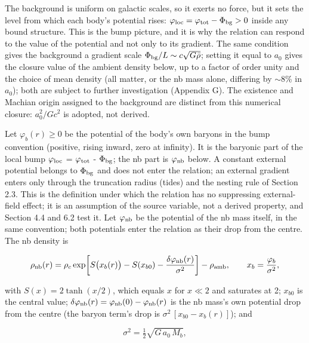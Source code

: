 \documentclass[
  10pt,
]{article}
\begin{document}
The background is uniform on galactic scales, so it exerts no force, but it sets the level from which each body's potential rises: $\varphi_{\rm loc}=\varphi_{\rm tot}-\Phi_{\rm bg}>0$ inside any bound structure. This is the bump picture, and it is why the relation can respond to the value of the potential and not only to its gradient. The same condition gives the background a gradient scale $\Phi_{\rm bg}/L\sim c\sqrt{G\bar\rho}$; setting it equal to $a_0$ gives the closure value of the ambient density below, up to a factor of order unity and the choice of mean density (all matter, or the nb mass alone, differing by $\sim$8\% in $a_0$); both are subject to further investigation (Appendix G). The existence and Machian origin assigned to the background are distinct from this numerical closure: $a_0^2/Gc^2$ is adopted, not derived.

Let $\varphi_b(r)\ge 0$ be the potential of the body's own baryons
in the bump convention (positive, rising inward, zero at infinity). It is
the baryonic part of the local bump
$\varphi_{\rm loc}$ = $\varphi_{\rm tot}$ - $\Phi_{\rm bg}$; the nb part is $\varphi_{\rm nb}$ below. A constant external potential belongs to
$\Phi_{\rm bg}$ and does not enter the relation; an external gradient enters only
through the truncation radius (tides) and the nesting rule of Section
2.3. This is the definition under which the relation has no suppressing
external-field effect; it is an assumption of the source variable, not a
derived property, and Section 4.4 and 6.2 test it. Let $\varphi_{\rm nb}$ be the
potential of the nb mass itself, in the same convention; both potentials
enter the relation as their drop from the centre. The nb density is

\begin{equation}
\rho_{\rm nb}(r)=\rho_c\exp\!\left[S\big(x_b(r)\big)-S(x_{b0})-\frac{\delta\varphi_{\rm nb}(r)}{\sigma^2}\right]-\rho_{\rm amb},\qquad x_b=\frac{\varphi_b}{\sigma^2},
\end{equation}

with $S(x)=2\tanh(x/2)$, which equals $x$ for $x\ll 2$ and
saturates at 2; $x_{b0}$ is the central value; $\delta\varphi_{\rm nb}(r)=\varphi_{\rm nb}(0)-\varphi_{\rm nb}(r)$ is the nb mass's own potential drop from the
centre (the baryon term's drop is $\sigma^2\,[x_{b0}-x_b(r)]$); and

\begin{equation}
\sigma^2=\tfrac12\sqrt{G\,a_0\,M_b},
\end{equation}
\end{document}
